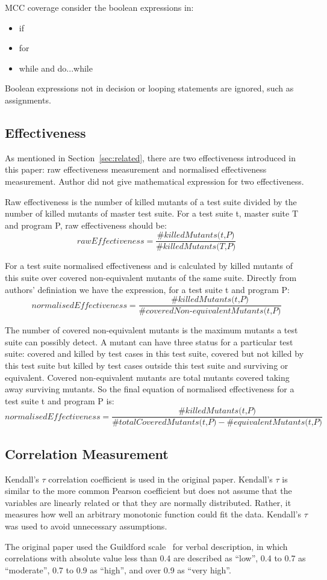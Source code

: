 MCC coverage consider the boolean expressions in:
	\begin{itemize}
		\item if
		\item for
		\item while and do...while
	\end{itemize}
Boolean expressions not in decision or looping statements are ignored, such as assignments.

\subsection{Effectiveness}
\label{subsec:effectiveness}
As mentioned in Section~\ref{sec:related}, there are two effectiveness introduced in this paper: raw effectiveness measurement and normalised effectiveness measurement. Author did not give mathematical expression for two effectiveness.

Raw effectiveness is the number of killed mutants of a test suite divided by the number of killed mutants of master test suite. For a test suite t, master suite T and program P, raw effectiveness should be:
\[\textit{rawEffectiveness} = \frac{\#\textit{killedMutants(t,P)}}{\#\textit{killedMutants(T,P)}}\]

For a test suite normalised effectiveness and is calculated by killed mutants of this suite over covered non-equivalent mutants of the same suite. Directly from authors' definiation we have the expression, for a test suite t and program P:
\[\textit{normalisedEffectiveness} = \frac{\#\textit{killedMutants(t,P)}}{\#\textit{coveredNon-equivalentMutants(t,P)}}\]

The number of covered non-equivalent mutants is the maximum mutants a test suite can possibly detect. A mutant can have three status for a particular test suite: covered and killed by test cases in this test suite, covered but not killed by this test suite but killed by test cases outside this test suite and surviving or equivalent. Covered non-equivalent mutants are total mutants covered taking away surviving mutants. So the final equation of normalised effectiveness for a test suite t and program P is:
\[\textit{normalisedEffectiveness} = \frac{\#\textit{killedMutants(t,P)}}{\#\textit{totalCoveredMutants(t,P)} - \#\textit{equivalentMutants(t,P)}}\]

\subsection{Correlation Measurement}

Kendall’s $\tau$ correlation coefficient is used in the original paper. Kendall’s $\tau$ is similar to the more common Pearson coefficient but does not assume that the variables are linearly related or that they are normally distributed. Rather, it measures how well an arbitrary monotonic function could fit the data. Kendall’s $\tau$ was used to avoid unnecessary assumptions.

The original paper used the Guildford scale~\cite{guilford1942fundamental} for verbal description, in which correlations with absolute value less than 0.4 are described as “low”, 0.4 to 0.7 as “moderate”, 0.7 to 0.9 as “high”, and over 0.9 as “very high”.